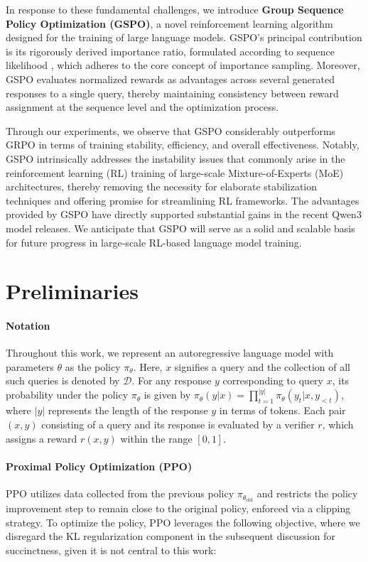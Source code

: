 In response to these fundamental challenges, we introduce \textbf{Group Sequence Policy Optimization (GSPO)}, a novel reinforcement learning algorithm designed for the training of large language models. GSPO’s principal contribution is its rigorously derived importance ratio, formulated according to sequence likelihood \citep{click}, which adheres to the core concept of importance sampling. Moreover, GSPO evaluates normalized rewards as advantages across several generated responses to a single query, thereby maintaining consistency between reward assignment at the sequence level and the optimization process.

Through our experiments, we observe that GSPO considerably outperforms GRPO in terms of training stability, efficiency, and overall effectiveness. Notably, GSPO intrinsically addresses the instability issues that commonly arise in the reinforcement learning (RL) training of large-scale Mixture-of-Experts (MoE) architectures, thereby removing the necessity for elaborate stabilization techniques and offering promise for streamlining RL frameworks. The advantages provided by GSPO have directly supported substantial gains in the recent Qwen3 model releases. We anticipate that GSPO will serve as a solid and scalable basis for future progress in large-scale RL-based language model training.

\section{Preliminaries}

\paragraph{Notation} 
Throughout this work, we represent an autoregressive language model with parameters $\theta$ as the policy $\pi_\theta$. Here, $x$ signifies a query and the collection of all such queries is denoted by $\mathcal{D}$. For any response $y$ corresponding to query $x$, its probability under the policy $\pi_\theta$ is given by $\pi_\theta (y | x)=\prod_{t=1}^{|y|} \pi_\theta (y_t | x, y_{<t} )$, where $|y|$ represents the length of the response $y$ in terms of tokens. Each pair $(x, y)$ consisting of a query and its response is evaluated by a verifier $r$, which assigns a reward $r(x, y)$ within the range $[0, 1]$.

\paragraph{Proximal Policy Optimization (PPO)} PPO \citep{ppo} utilizes data collected from the previous policy $\pi_{\theta_\text{old}}$ and restricts the policy improvement step to remain close to the original policy, enforced via a clipping strategy. To optimize the policy, PPO leverages the following objective, where we disregard the KL regularization component in the subsequent discussion for succinctness, given it is not central to this work:

